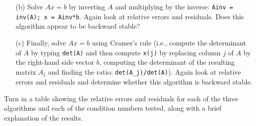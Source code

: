 \documentclass[10pt]{article}
\begin{document}
\begin{problem}[Exercise 1]
\begin{enumerate}
\item[(b)] Solve \(Ax=b\) by inverting \(A\) and multiplying by the inverse: {\tt Ainv = inv(A); x = Ainv*b}.  Again look at relative errors and 
residuals.  Does this algorithm appear to be backward stable?

\item[(c)] Finally, solve \(Ax=b\) using Cramer's rule (i.e., compute the determinant of \(A\) by typing \verb+det(A)+ and then compute \verb+x(j)+ by replacing column \(j\) of \(A\) by the right-hand side vector \(b\), computing the determinant of the resulting matrix \(A_j\) and finding the ratio:  \verb+det(A_j)/det(A)+). Again look at relative errors and residuals and determine whether this  algorithm is backward stable.
\end{enumerate}

Turn in a table showing the relative errors and residuals for each of the three algorithms and each of the condition numbers tested, along with a  brief explanation of the results.
\end{problem}
\end{document}
